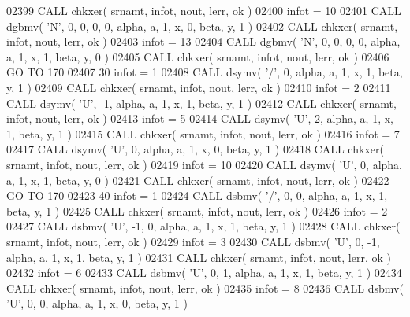 \begin{DoxyCode}
02399       \textcolor{keyword}{CALL }chkxer( srnamt, infot, nout, lerr, ok )
02400       infot = 10
02401       \textcolor{keyword}{CALL }dgbmv( \textcolor{stringliteral}{'N'}, 0, 0, 0, 0, alpha, a, 1, x, 0, beta, y, 1 )
02402       \textcolor{keyword}{CALL }chkxer( srnamt, infot, nout, lerr, ok )
02403       infot = 13
02404       \textcolor{keyword}{CALL }dgbmv( \textcolor{stringliteral}{'N'}, 0, 0, 0, 0, alpha, a, 1, x, 1, beta, y, 0 )
02405       \textcolor{keyword}{CALL }chkxer( srnamt, infot, nout, lerr, ok )
02406       \textcolor{keywordflow}{GO TO} 170
02407    30 infot = 1
02408       \textcolor{keyword}{CALL }dsymv( \textcolor{stringliteral}{'/'}, 0, alpha, a, 1, x, 1, beta, y, 1 )
02409       \textcolor{keyword}{CALL }chkxer( srnamt, infot, nout, lerr, ok )
02410       infot = 2
02411       \textcolor{keyword}{CALL }dsymv( \textcolor{stringliteral}{'U'}, -1, alpha, a, 1, x, 1, beta, y, 1 )
02412       \textcolor{keyword}{CALL }chkxer( srnamt, infot, nout, lerr, ok )
02413       infot = 5
02414       \textcolor{keyword}{CALL }dsymv( \textcolor{stringliteral}{'U'}, 2, alpha, a, 1, x, 1, beta, y, 1 )
02415       \textcolor{keyword}{CALL }chkxer( srnamt, infot, nout, lerr, ok )
02416       infot = 7
02417       \textcolor{keyword}{CALL }dsymv( \textcolor{stringliteral}{'U'}, 0, alpha, a, 1, x, 0, beta, y, 1 )
02418       \textcolor{keyword}{CALL }chkxer( srnamt, infot, nout, lerr, ok )
02419       infot = 10
02420       \textcolor{keyword}{CALL }dsymv( \textcolor{stringliteral}{'U'}, 0, alpha, a, 1, x, 1, beta, y, 0 )
02421       \textcolor{keyword}{CALL }chkxer( srnamt, infot, nout, lerr, ok )
02422       \textcolor{keywordflow}{GO TO} 170
02423    40 infot = 1
02424       \textcolor{keyword}{CALL }dsbmv( \textcolor{stringliteral}{'/'}, 0, 0, alpha, a, 1, x, 1, beta, y, 1 )
02425       \textcolor{keyword}{CALL }chkxer( srnamt, infot, nout, lerr, ok )
02426       infot = 2
02427       \textcolor{keyword}{CALL }dsbmv( \textcolor{stringliteral}{'U'}, -1, 0, alpha, a, 1, x, 1, beta, y, 1 )
02428       \textcolor{keyword}{CALL }chkxer( srnamt, infot, nout, lerr, ok )
02429       infot = 3
02430       \textcolor{keyword}{CALL }dsbmv( \textcolor{stringliteral}{'U'}, 0, -1, alpha, a, 1, x, 1, beta, y, 1 )
02431       \textcolor{keyword}{CALL }chkxer( srnamt, infot, nout, lerr, ok )
02432       infot = 6
02433       \textcolor{keyword}{CALL }dsbmv( \textcolor{stringliteral}{'U'}, 0, 1, alpha, a, 1, x, 1, beta, y, 1 )
02434       \textcolor{keyword}{CALL }chkxer( srnamt, infot, nout, lerr, ok )
02435       infot = 8
02436       \textcolor{keyword}{CALL }dsbmv( \textcolor{stringliteral}{'U'}, 0, 0, alpha, a, 1, x, 0, beta, y, 1 )

\end{DoxyCode}
